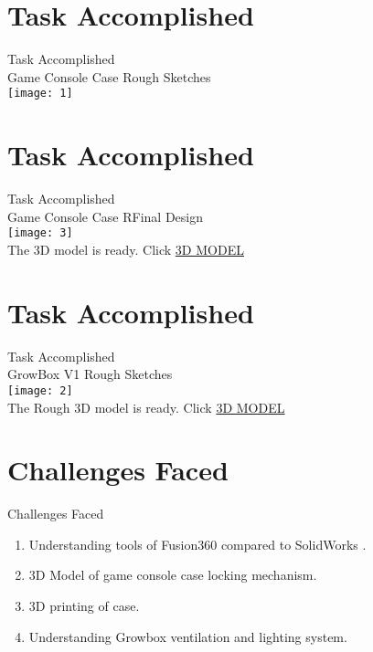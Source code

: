 \documentclass[10pt, a4paper]{beamer}
\begin{document}
\section{Task Accomplished}
\begin{frame}{Task Accomplished}\\
{Game Console Case Rough Sketches}\\
\hfill\texttt{[image: 1]}\\
\end{frame}

\section{Task Accomplished}
\begin{frame}{Task Accomplished}\\
{Game Console Case RFinal Design}\\
\hfill\texttt{[image: 3]}\\
 {The 3D model is ready. Click} \href{http://a360.co/2rJez0H}{3D MODEL}
\end{frame}

\section{Task Accomplished}
\begin{frame}{Task Accomplished}\\
{GrowBox V1 Rough Sketches}\\
\hfill\texttt{[image: 2]}\\
 {The Rough 3D model is ready. Click} \href{http://a360.co/2rDtaIQ}{3D MODEL}
\end{frame}
 
\section{Challenges Faced}
\begin{frame}{Challenges Faced}
	\begin{enumerate}
		\item Understanding tools of Fusion360 compared to SolidWorks .
		\item 3D Model of game console case locking mechanism.
		\item 3D printing of case. 
		\item Understanding Growbox ventilation and lighting system.
	\end{enumerate}
\end{frame}
 
\end{document}
